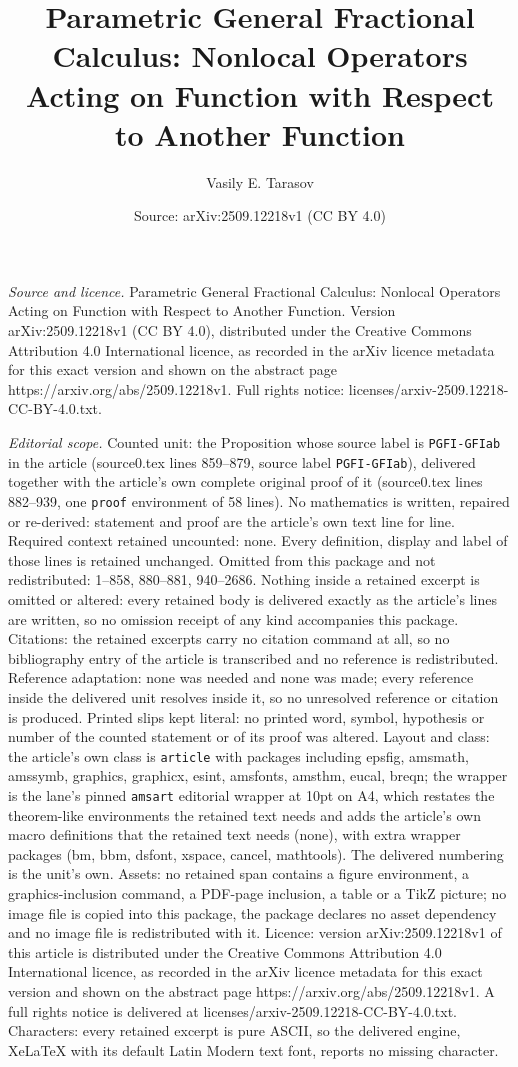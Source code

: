 \documentclass[10pt,a4paper]{amsart}
\title[Parametric General Fractional Calculus: Nonlocal Operators A]{Parametric General Fractional Calculus: Nonlocal Operators Acting on Function with Respect to Another Function}
\author{Vasily E. Tarasov}
\date{Source: arXiv:2509.12218v1 (CC BY 4.0)}
\begin{document}
\maketitle

\noindent\emph{Source and licence.} Parametric General Fractional Calculus: Nonlocal Operators Acting on Function with Respect to Another Function. Version arXiv:2509.12218v1 (CC BY 4.0), distributed under the Creative Commons Attribution 4.0 International licence, as recorded in the arXiv licence metadata for this exact version and shown on the abstract page https://arxiv.org/abs/2509.12218v1. Full rights notice: licenses/arxiv-2509.12218-CC-BY-4.0.txt.\par\smallskip

\noindent\textit{Editorial scope.} Counted unit: the Proposition whose source label is \texttt{PGFI-GFIab} in the article (source0.tex lines 859--879, source label \texttt{PGFI-GFIab}), delivered together with the article's own complete original proof of it (source0.tex lines 882--939, one \texttt{proof} environment of 58 lines). No mathematics is written, repaired or re-derived: statement and proof are the article's own text line for line. Required context retained uncounted: none. Every definition, display and label of those lines is retained unchanged. Omitted from this package and not redistributed: 1--858, 880--881, 940--2686. Nothing inside a retained excerpt is omitted or altered: every retained body is delivered exactly as the article's lines are written, so no omission receipt of any kind accompanies this package. Citations: the retained excerpts carry no citation command at all, so no bibliography entry of the article is transcribed and no reference is redistributed. Reference adaptation: none was needed and none was made; every reference inside the delivered unit resolves inside it, so no unresolved reference or citation is produced. Printed slips kept literal: no printed word, symbol, hypothesis or number of the counted statement or of its proof was altered. Layout and class: the article's own class is \texttt{article} with packages including epsfig, amsmath, amssymb, graphics, graphicx, esint, amsfonts, amsthm, eucal, breqn; the wrapper is the lane's pinned \texttt{amsart} editorial wrapper at 10pt on A4, which restates the theorem-like environments the retained text needs and adds the article's own macro definitions that the retained text needs (none), with extra wrapper packages (bm, bbm, dsfont, xspace, cancel, mathtools). The delivered numbering is the unit's own. Assets: no retained span contains a figure environment, a graphics-inclusion command, a PDF-page inclusion, a table or a TikZ picture; no image file is copied into this package, the package declares no asset dependency and no image file is redistributed with it. Licence: version arXiv:2509.12218v1 of this article is distributed under the Creative Commons Attribution 4.0 International licence, as recorded in the arXiv licence metadata for this exact version and shown on the abstract page https://arxiv.org/abs/2509.12218v1. A full rights notice is delivered at licenses/arxiv-2509.12218-CC-BY-4.0.txt. Characters: every retained excerpt is pure ASCII, so the delivered engine, XeLaTeX with its default Latin Modern text font, reports no missing character.
\end{document}
